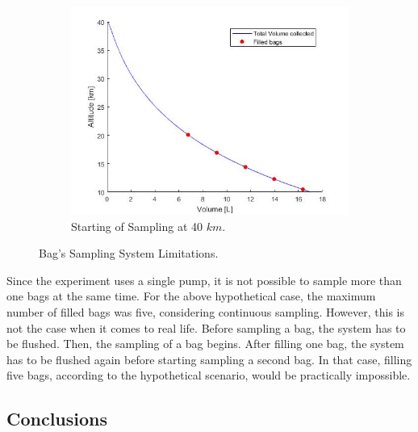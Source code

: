 \documentclass[a4paper,12pt,oneside]{article} %
\providecommand{\DIFaddtex}[1]{{\protect\color{blue}\uwave{#1}}} %
\providecommand{\DIFaddbegin}{} %
\providecommand{\DIFaddend}{} %
\providecommand{\DIFdelbegin}{} %
\providecommand{\DIFdelend}{} %
\providecommand{\DIFadd}[1]{\texorpdfstring{\DIFaddtex{#1}}{#1}} %
\newcommand{\DIFscaledelfig}{0.5}
\newlength{\DIFdelgraphicswidth} %
\newlength{\DIFdelgraphicsheight} %
\newcommand{\DIFaddincludegraphics}[2][]{{\color{blue}\fbox{\DIFOincludegraphics[#1]{#2}}}} %
\newcommand{\DIFdelincludegraphics}[2][]{%
\sbox{\DIFdelgraphicsbox}{\DIFOincludegraphics[#1]{#2}}%
\settoboxwidth{\DIFdelgraphicswidth}{\DIFdelgraphicsbox} %
\settoboxtotalheight{\DIFdelgraphicsheight}{\DIFdelgraphicsbox} %
\scalebox{\DIFscaledelfig}{%
\parbox[b]{\DIFdelgraphicswidth}{\usebox{\DIFdelgraphicsbox}\\[-\baselineskip] \rule{\DIFdelgraphicswidth}{0em}}\llap{\resizebox{\DIFdelgraphicswidth}{\DIFdelgraphicsheight}{%
\setlength{\unitlength}{\DIFdelgraphicswidth}%
\begin{picture}(1,1)%
\thicklines\linethickness{2pt} %
{\color[rgb]{1,0,0}\put(0,0){\framebox(1,1){}}}%
{\color[rgb]{1,0,0}\put(0,0){\line( 1,1){1}}}%
{\color[rgb]{1,0,0}\put(0,1){\line(1,-1){1}}}%
\end{picture}%
}\hspace*{3pt}}} %
} %
\DeclareRobustCommand{\DIFaddbegin}{\DIFOaddbegin \let\includegraphics\DIFaddincludegraphics} %
\DeclareRobustCommand{\DIFaddend}{\DIFOaddend \let\includegraphics\DIFOincludegraphics} %
\DeclareRobustCommand{\DIFdelbegin}{\DIFOdelbegin \let\includegraphics\DIFdelincludegraphics} %
\DeclareRobustCommand{\DIFdelend}{\DIFOaddend \let\includegraphics\DIFOincludegraphics} %
\begin{document}
\begin{appendices}
\begin{figure}[H]
\begin{subfigure}{0.45\textwidth}
    \centering\includegraphics[width=1.2\textwidth]{appendix/img/samplevolume40km.png}
    \caption{Starting of Sampling at 40 $km$.}
  \end{subfigure}
  \caption{Bag's Sampling System Limitations.}\label{fig:limits}
\end{figure}


\bigskip
\DIFdelbegin %
\DIFdelend \DIFaddbegin \underline{\DIFadd{One Single Pump}}
\DIFaddend 

\smallskip
Since the experiment uses a single pump, it is not possible to sample more than one bags at the same time. For the above hypothetical case, the maximum number of filled bags was five, considering continuous sampling. However, this is not the case when it comes to real life. Before sampling a bag, the system has to be flushed. Then, the sampling of a bag begins. After filling one bag, the system has to be flushed again before starting sampling a second bag. In that case, filling five bags, according to the hypothetical scenario, would be practically impossible.


\newpage
\subsection{Conclusions}


\end{appendices}
\end{document}
